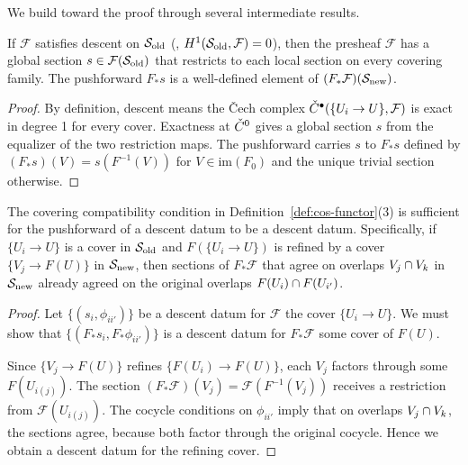 \documentclass[11pt]{article}
\newcommand{\SiteOld}{\Site_{\mathrm{old}}}
\newcommand{\SiteNew}{\Site_{\mathrm{new}}}
\newcommand{\FunctorF}{F}
\newcommand{\Pushforward}{F_*}
\begin{document}
We build toward the proof through several intermediate results.

\begin{lemma}\label{lem:global-transfer}
If $\mathcal{F}$ satisfies descent on $\SiteOld$ (\ie,
$\Hcoh{1}(\SiteOld, \mathcal{F}) = 0$), then the presheaf $\mathcal{F}$
has a global section $s \in \mathcal{F}(\SiteOld)$ that restricts to each
local section on every covering family.  The pushforward $\Pushforward s$
is a well-defined element of $(\Pushforward\mathcal{F})(\SiteNew)$.
\end{lemma}

\begin{proof}
By definition, descent means the \v{C}ech complex
$\check{C}^{\bullet}(\{U_i \to U\}, \mathcal{F})$ is exact in degree 1 for
every cover.  Exactness at $\check{C}^0$ gives a global section $s$ from the
equalizer of the two restriction maps.  The pushforward carries $s$ to
$\Pushforward s$ defined by $(\Pushforward s)(V) = s(\FunctorF^{-1}(V))$
for $V \in \mathrm{im}(\FunctorF_0)$ and the unique trivial section
otherwise.
\end{proof}

\begin{lemma}\label{lem:cov-compat-suff}
The covering compatibility condition in Definition~\ref{def:cos-functor}(3)
is sufficient for the pushforward of a descent datum to be a descent datum.
Specifically, if $\{U_i \to U\}$ is a cover in $\SiteOld$ and
$\FunctorF(\{U_i \to U\})$ is refined by a cover
$\{V_j \to \FunctorF(U)\}$ in $\SiteNew$, then sections of
$\Pushforward\mathcal{F}$ that agree on overlaps
$V_j \cap V_k$ in $\SiteNew$ already agreed on the original
overlaps $\overlap{\FunctorF(U_i)}{\FunctorF(U_{i'})}$.
\end{lemma}

\begin{proof}
Let $\{(s_i, \phi_{ii'})\}$ be a descent datum for $\mathcal{F}$ \wrt
the cover $\{U_i \to U\}$.  We must show that $\{(\Pushforward s_i,
\Pushforward\phi_{ii'})\}$ is a descent datum for $\Pushforward\mathcal{F}$
\wrt some cover of $\FunctorF(U)$.

Since $\{V_j \to \FunctorF(U)\}$ refines $\{\FunctorF(U_i) \to
\FunctorF(U)\}$, each $V_j$ factors through some $\FunctorF(U_{i(j)})$.
The section $(\Pushforward\mathcal{F})(V_j) =
\mathcal{F}(\FunctorF^{-1}(V_j))$ receives a restriction from
$\mathcal{F}(U_{i(j)})$.  The cocycle conditions on
$\phi_{ii'}$ imply that on overlaps $V_j \cap V_k$,
the sections agree, because both factor through the original
cocycle.  Hence we obtain a descent datum for the refining cover.
\end{proof}
\end{document}
